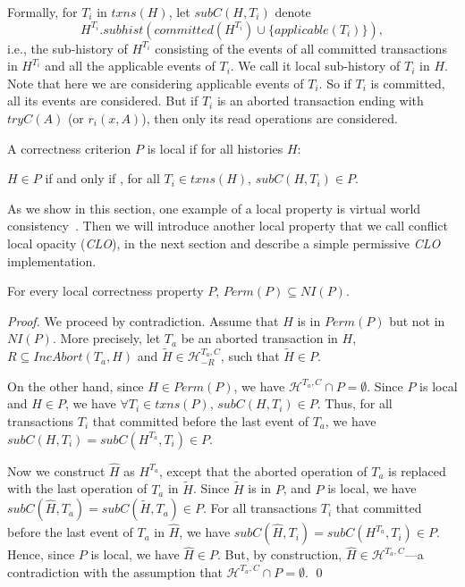 \documentclass{llncs}
\def\H{\ensuremath{\mathcal{H}}}
\newcommand{\op} {operation}
\newcommand{\clo} {\textit{CLO}}
\newcommand{\comm}{\textit{committed}}
\newcommand{\txns}{\textit{txns}}
\newcommand{\permfn}[1] {\textit{Perm}(#1)}
\newcommand{\nifn}[1] {\textit{NI}(#1)}
\newcommand{\prevA}[2] {\textit{IncAbort}(#1, #2)}
\newcommand{\subs}[2]  {\textit{subC}(#2,#1)}
\newcommand{\shist}[2]  {#2.subhist(#1)}
\newcommand{\applfn}[2]  {applicable(#1)}
\newcommand{\tryc} {\textit{tryC}}
\begin{document}
Formally, for $T_i$ in $\txns(H)$, let $\subs{T_i}{H}$ denote
\[
\shist{\comm(H^{T_i})\cup\{\applfn{T_i}{H}\}}{H^{T_i}},
\]
i.e., the sub-history of $H^{T_i}$ consisting of the events of all committed transactions in $H^{T_i}$ and all the applicable events of $T_i$. We call it local sub-history of $T_i$ in $H$. Note that here we are considering applicable events of $T_i$. So if $T_i$ is committed, all its events are considered. But if $T_i$ is an aborted transaction ending with $\tryc(A)$ (or $r_i(x,A)$), then only its read \op{s} are considered.

\begin{definition}
\label{def:local}
A correctness criterion $P$ is local if for all histories $H$: 
\begin{description}
\item $H\in P$ if and only if , for all $T_i\in\txns(H)$,
  $\subs{T_i}{H}\in P$.
\end{description}
\end{definition} 
As we show in this section,  one example of a local property is virtual world
consistency~\cite{ImbsRay:2009:SIROCCO}.
Then we will introduce another local property that we call conflict local opacity (\clo), in the next section and describe a simple permissive \clo{} implementation.



\begin{theorem}
\label{thm:perm_ni}
For every local correctness property $P$, $\permfn{P}\subseteq \nifn{P}$.
\end{theorem}


\begin{proof}
We proceed by contradiction. Assume that $H$ is in
$\permfn{P}$ but not in $\nifn{P}$. 
More precisely, let $T_a$ be an aborted transaction in $H$, 
$R \subseteq \prevA{T_a}{H}$ and  
$\widetilde H \in \H^{T_a,C}_{-R}$, such that  $\widetilde H \in P$.

On the other hand, since $H\in \permfn{P}$, we have  
$\H^{T_a,C} \cap P = \emptyset$.
Since $P$ is local and $H\in P$, we have $\forall T_i\in\txns(P)$, 
 $\subs{T_i}{H}\in P$. 
Thus, for all transactions $T_i$ that
 committed before the last event of $T_a$, we have  
$\subs{T_i}{H}=\subs{T_i}{H^{T_a}}\in P$.    

Now we construct $\widehat H$ as $H^{T_a}$, except that the aborted
operation of $T_a$ is replaced with the last operation of $T_a$ in
$\widetilde H$.  Since $\widetilde H$ is in $P$, and $P$ is local, 
we have $\subs{T_a}{\widehat H} =
\subs{T_a}{\widetilde H}\in P$. 
For all transactions $T_i$ that committed before the last event of $T_a$ in
$\widehat H$, we have  $\subs{T_i}{\widehat H}=\subs{T_i}{H^{T_a}}\in P$.
Hence, since $P$ is local, we have $\widehat H\in P$.
But, by construction, $\widehat H\in\H^{T_a,C}$---a contradiction with
the assumption that $\H^{T_a,C} \cap P = \emptyset$.
\qed
\end{proof}
\end{document}

